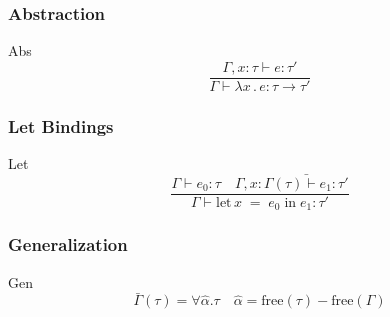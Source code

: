 \documentclass{beamer}
\begin{document}
\begin{frame}
  \frametitle{Abstraction}
  \begin{exampleblock}{Abs}
    \[
      \frac{\Gamma, x : \tau \vdash e : \tau'}
      {\Gamma \vdash \lambda x\, .\, e : \tau \rightarrow \tau'}
    \]
  \end{exampleblock}
\end{frame}

\begin{frame}
  \frametitle{Let Bindings}
  \begin{exampleblock}{Let}
    \[
      \frac{\Gamma \vdash e_0 : \tau \quad \Gamma, x : \bar{\Gamma(\tau) \vdash e_1 : \tau'}}
      {\Gamma \vdash \text{let}\, x\; =\; e_0\; \text{in}\; e_1 : \tau'}
    \]
  \end{exampleblock}
\end{frame}

\begin{frame}
  \frametitle{Generalization}
  \begin{exampleblock}{Gen}
    \[
      \bar{\Gamma}(\tau) = \forall \hat{\alpha} . \tau \quad \hat{\alpha} = \text{free}(\tau) - \text{free}(\Gamma)
    \]
  \end{exampleblock}
\end{frame}
\end{document}
